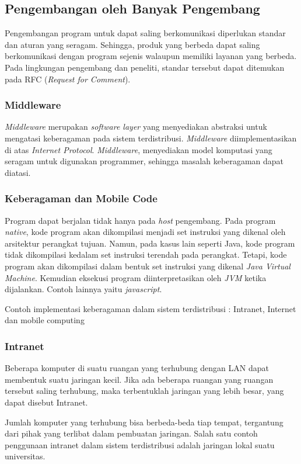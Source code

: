 \documentclass[12pt,a4paper]{apa}
\begin{document}
	\subsection{\textbf{Pengembangan oleh Banyak Pengembang}}
	Pengembangan program untuk dapat saling berkomunikasi diperlukan standar dan aturan yang seragam. Sehingga, produk yang berbeda dapat saling berkomunikasi dengan program sejenis walaupun memiliki layanan yang berbeda. Pada lingkungan pengembang dan peneliti, standar tersebut dapat ditemukan pada RFC (\emph{Request for Comment}).
	\subsubsection{\textbf{Middleware}}
	\emph{Middleware} merupakan \emph{software layer} yang menyediakan abstraksi untuk mengatasi keberagaman pada sistem terdistribusi. \emph{Middleware} diimplementasikan di atas \emph{Internet Protocol}. \emph{Middleware}, menyediakan model komputasi yang seragam untuk digunakan programmer, sehingga masalah keberagaman dapat diatasi. \cite{Coulouris2012}
	\subsubsection{\textbf{Keberagaman dan Mobile Code}}
	Program dapat berjalan tidak hanya pada \emph{host} pengembang. Pada program \emph{native}, kode program akan dikompilasi menjadi set instruksi yang dikenal oleh arsitektur perangkat tujuan. Namun, pada kasus lain  seperti Java, kode program tidak dikompilasi kedalam set instruksi terendah pada perangkat. Tetapi, kode program akan dikompilasi dalam bentuk set instruksi yang dikenal \emph{Java Virtual Machine}. Kemudian eksekusi program diinterpretasikan oleh \emph{JVM} ketika dijalankan. Contoh lainnya yaitu \emph{javascript}. \cite{Coulouris2012}
	
	Contoh implementasi keberagaman dalam sistem terdistribusi : Intranet, Internet dan mobile computing \cite{Kamalapur2008}
	\subsubsection{\textbf{Intranet}}
		Beberapa komputer di suatu ruangan yang terhubung dengan LAN dapat membentuk suatu jaringan kecil. Jika ada beberapa ruangan yang ruangan tersebut saling terhubung, maka terbentuklah jaringan yang lebih besar, yang dapat disebut Intranet.
		
		Jumlah komputer yang terhubung bisa berbeda-beda tiap tempat, tergantung dari pihak yang terlibat dalam pembuatan jaringan. Salah satu contoh penggunaan intranet dalam sistem terdistribusi adalah jaringan lokal suatu universitas.
		
\end{document}
